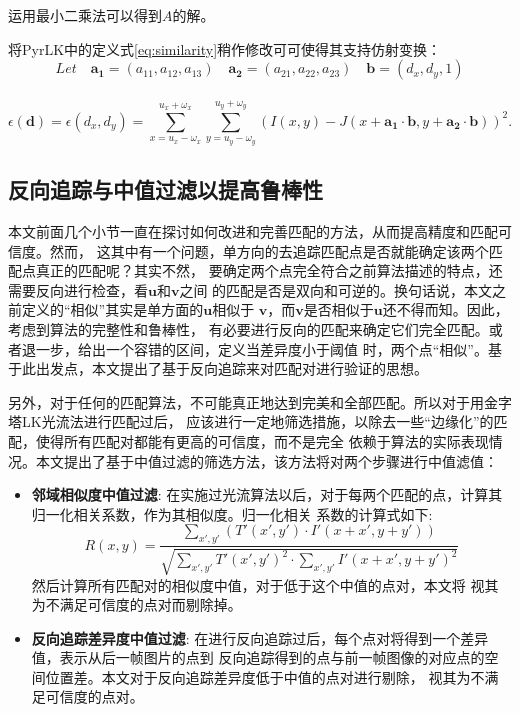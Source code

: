 运用最小二乘法可以得到$A$的解。

将PyrLK中的定义式\ref{eq:similarity}稍作修改可可使得其支持仿射变换：\\
\[ Let\quad \mathbf{a_1}=(a_{11},a_{12},a_{13})\quad \mathbf{a_2}=(a_{21},a_{22},a_{23})\quad
\mathbf{b}=(d_x,d_y,1)\]\\
\begin{equation}\label{eq:affine}
	\epsilon(\mathbf{d})=\epsilon(d_x,d_y)=\sum_{x=u_x-\omega_x}^{u_x+\omega_x}\sum_{y=u_y-\omega_y}
	^{u_y+\omega_y}(I(x,y) - J(x+\mathbf{a_1}\cdot \mathbf{b},y+\mathbf{a_2}\cdot \mathbf{b}))^2.
\end{equation}


\subsection{反向追踪与中值过滤以提高鲁棒性}
本文前面几个小节一直在探讨如何改进和完善匹配的方法，从而提高精度和匹配可信度。然而，
这其中有一个问题，单方向的去追踪匹配点是否就能确定该两个匹配点真正的匹配呢？其实不然，
要确定两个点完全符合之前算法描述的特点，还需要反向进行检查，看$\mathbf{u}$和$\mathbf{v}$之间
的匹配是否是双向和可逆的。换句话说，本文之前定义的“相似”其实是单方面的$\mathbf{u}$相似于
$\mathbf{v}$，而$\mathbf{v}$是否相似于$\mathbf{u}$还不得而知。因此，考虑到算法的完整性和鲁棒性，
有必要进行反向的匹配来确定它们完全匹配。或者退一步，给出一个容错的区间，定义当差异度小于阈值
时，两个点“相似”。基于此出发点，本文提出了基于反向追踪来对匹配对进行验证的思想。

另外，对于任何的匹配算法，不可能真正地达到完美和全部匹配。所以对于用金字塔LK光流法进行匹配过后，
应该进行一定地筛选措施，以除去一些“边缘化”的匹配，使得所有匹配对都能有更高的可信度，而不是完全
依赖于算法的实际表现情况。本文提出了基于中值过滤的筛选方法，该方法将对两个步骤进行中值滤值：\\
\begin{itemize}
	\item \textbf{邻域相似度中值过滤}: 在实施过光流算法以后，对于每两个匹配的点，计算其归一化相关系数，作为其相似度。归一化相关
		系数的计算式如下:
		\begin{equation} \label{eq:ccoeff}
			R(x,y) = \frac{\sum_{x',y'}(T'(x',y')\cdot I'(x + x', y + y'))}
			{\sqrt{\sum_{x', y'}T'(x',y')^2\cdot \sum_{x',y'}I'(x+x',y+y')^2}}
		\end{equation}
		然后计算所有匹配对的相似度中值，对于低于这个中值的点对，本文将
		视其为不满足可信度的点对而剔除掉。
	\item \textbf{反向追踪差异度中值过滤}: 在进行反向追踪过后，每个点对将得到一个差异值，表示从后一帧图片的点到
		反向追踪得到的点与前一帧图像的对应点的空间位置差。本文对于反向追踪差异度低于中值的点对进行剔除，
		视其为不满足可信度的点对。
\end{itemize}

